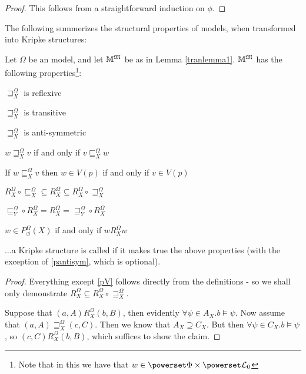 \begin{proof}
  This follows from a straightforward induction on $\phi$.
\end{proof}

The following summerizes the structural properties of
 models, when transformed into Kripke structures:

\begin{proposition}
  Let $\Omega$ be an  model, and let $\mathbbm{M}^{\Omega}$ be
  as in Lemma \ref{tranlemma1}.  $\mathbbm{M}^{\Omega}$ has the following
  properties{\footnote{Note that in this we have that $w \in \powerset \Phi
  \times \powerset \mathcal{L}_0$}}:
  \begin{myRoman}
    \item $\sqsupseteq^{\Omega}_X$ is reflexive
    
    \item $\sqsupseteq^{\Omega}_X$ is transitive
    
    \item \label{pantisym}$\sqsupseteq^{\Omega}_X$ is anti-symmetric
    
    \item $w \sqsupseteq^{\Omega}_X v$ if and only if $v
    \sqsubseteq^{\Omega}_X w$
    
    \item If $w \sqsubseteq^{\Omega}_X v$ then $w \in V (p)$ if and only if $v
    \in V (p)$
    
    \item \label{pV}$R^{\Omega}_X \circ \sqsubseteq^{\Omega}_X \subseteq
    R^{\Omega}_X \subseteq R^{\Omega}_X \circ \sqsupseteq^{\Omega}_X$
    
    \item $\sqsubseteq^{\Omega}_Y \circ R^{\Omega}_X = R^{\Omega}_X =
    \sqsupseteq^{\Omega}_Y \circ R^{\Omega}_X$
    
    \item $w \in P_{\circlearrowleft}^{\Omega} (X)$ if and only if $w
    R^{\Omega}_X w$
  \end{myRoman}
  $\ldots$a Kripke structure is called  if it makes true the
  above properties (with the exception of \ref{pantisym}, which is optional).
\end{proposition}

\begin{proof}
  Everything except \ref{pV} follows directly from the definitions - so we shall only
  demonstrate $R^{\Omega}_X \subseteq R^{\Omega}_X \circ
  \sqsupseteq^{\Omega}_X$.
  
  Suppose that $(a, A) R^{\Omega}_X (b, B)$, then evidently $\forall \psi \in
  A_X .b \models \psi$.  Now assume that $(a, A) \sqsupseteq_X^{\Omega} (c,
  C)$.  Then we know that $A_X \supseteq C_X$.  But then $\forall \psi \in
  C_X .b \models \psi$, so $(c, C) R^{\Omega}_X (b, B)$, which suffices to
  show the claim.
\end{proof}

